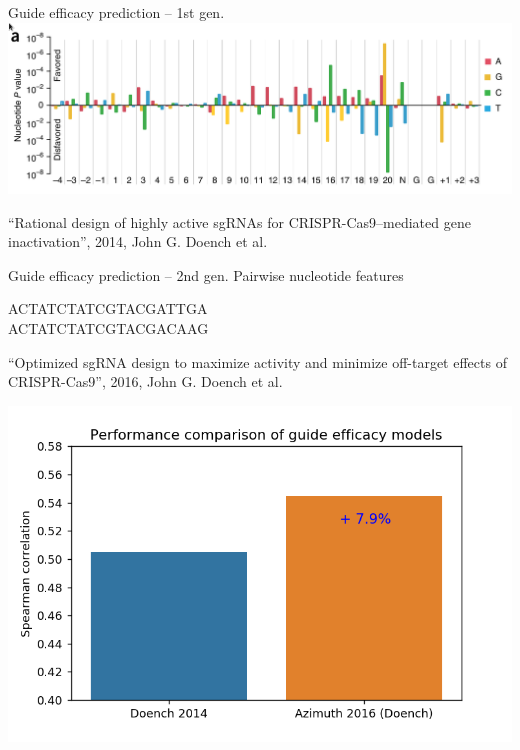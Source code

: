 \documentclass[Nike]{tuberlinbeamer}
\begin{document}
\begin{frame}{Guide efficacy prediction -- 1st gen.}
  \includegraphics[width=\linewidth]{./nucleotide_table.png}
  \begin{flushright}
    \tiny
    ``Rational design of highly active sgRNAs for CRISPR-Cas9–mediated gene inactivation'', 2014, John G. Doench et al.\
  \end{flushright}
\end{frame}

\begin{frame}{Guide efficacy prediction -- 2nd gen.}
  Pairwise nucleotide features

  \pause
  \huge ACTATCTATCGTACGA{\color{red}TT}GA \\
    \pause
  ACTATCTATCGTACGAC{\color{red}AA}G
    \begin{flushright}
      \tiny
      ``Optimized sgRNA design to maximize activity and minimize off-target effects of CRISPR-Cas9'', 2016, John G. Doench et al.\
    \end{flushright}
    \pause
  \center
  \includegraphics[width=0.5\linewidth]{./model_comparison1.png}
\end{frame}

\end{document}
